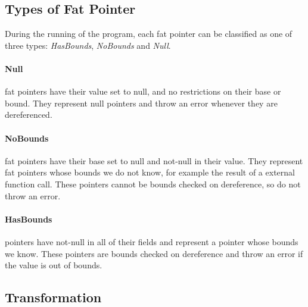 
\subsection{Types of Fat Pointer}

During the running of the program, each fat pointer can be classified as one of three types: \textit{HasBounds}, \textit{NoBounds} and \textit{Null}.

\paragraph{Null} fat pointers have their value set to null, and no restrictions on their base or bound.
They represent null pointers and throw an error whenever they are dereferenced.

\paragraph{NoBounds} fat pointers have their base set to null and not-null in their value.
They represent fat pointers whose bounds we do not know, for example the result of a external function call.
These pointers cannot be bounds checked on dereference, so do not throw an error.

\paragraph{HasBounds} pointers have not-null in all of their fields and represent a pointer whose bounds we know.
These pointers are bounds checked on dereference and throw an error if the value is out of bounds.

\subsection{Transformation}

